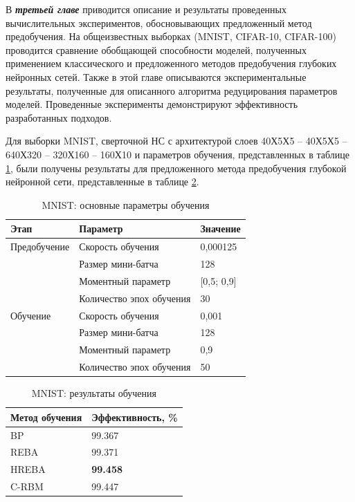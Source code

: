\documentclass{thesisby}
\begin{document}
В \textbf{\textit{третьей главе}} приводится описание и результаты проведенных вычислительных экспериментов, обосновывающих предложенный метод предобучения. На общеизвестных выборках (MNIST, CIFAR-10, CIFAR-100) проводится сравнение обобщающей способности моделей, полученных применением классического и предложенного методов предобучения глубоких нейронных сетей. Также в этой главе описываются экспериментальные результаты, полученные для описанного алгоритма редуцирования параметров моделей. Проведенные эксперименты демонстрируют эффективность разработанных подходов.
	
Для выборки MNIST, сверточной НС с архитектурой слоев 40Х5Х5 -- 40Х5Х5 -- 640Х320 -- 320Х160 -- 160Х10 и параметров обучения, представленных в таблице \ref{table:params_mnist}, были получены результаты для предложенного метода предобучения глубокой нейронной сети, представленные в таблице \ref{table:results_mnist}.
	
\begin{table} [!h]
  \small
  \caption{MNIST: основные параметры обучения}\label{table:params_mnist}
\centering
\begin{tabular}{| p{3cm} | p{6cm} | p{2cm} |}
  \hline
    \textbf{Этап} & \textbf{Параметр} & \textbf{Значение}\\
    \hline
    Предобучение & Скорость обучения & 0,000125\\
    \cline{2-3}
    & Размер мини-батча & 128 \\
    \cline{2-3}
    & Моментный параметр & [0,5; 0,9] \\
    \cline{2-3}
    & Количество эпох обучения & 30\\
    \hline
    Обучение & Скорость обучения & 0,001\\
    \cline{2-3}
    & Размер мини-батча & 128 \\
    \cline{2-3}
    & Моментный параметр & 0,9 \\
    \cline{2-3}
    & Количество эпох обучения & 50\\
    \hline
\end{tabular}
\end{table}

\begin{table} [!h]
  \small
  \caption{MNIST: результаты обучения}\label{table:results_mnist}
\centering
\begin{tabular}{| p{6cm} | p{6cm} |}
  \hline
    \textbf{Метод обучения} & \textbf{Эффективность, \%}\\
    \hline
    BP & 99.367\\
    \hline
    REBA & 99.371\\
    \hline
    HREBA & \textbf{99.458}\\
    \hline
    C-RBM & 99.447\\
    \hline
\end{tabular}
\end{table}
\end{document}

